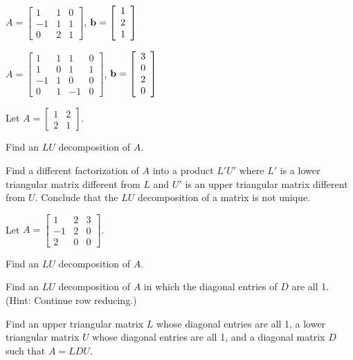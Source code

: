 	\item $A = \left[ \begin{array}{rcc} 1&1&0 \\ -1&1&1 \\ 0&2&1 \end{array} \right]$, $\mathbf{b} = \left[ \begin{array}{c} 1 \\ 2 \\ 1 \end{array} \right]$
	
	\item $A = \left[ \begin{array}{rcrc} 1&1&1&0 \\ 1&0&1&1 \\ -1&1&0&0 \\ 0&1&-1&0 \end{array} \right]$, $\mathbf{b} = \left[ \begin{array}{c} 3 \\ 0 \\ 2 \\ 0 \end{array} \right]$
	
	\ea

\item Let $A = \left[ \begin{array}{cc} 1&2\\2&1 \end{array} \right]$.
	\ba
	\item Find an $LU$ decomposition of $A$.
	\item Find a different factorization of $A$ into a product $L'U'$ where $L'$ is a lower triangular matrix different from $L$ and $U'$ is an upper triangular matrix different from $U$. Conclude that the $LU$ decomposition of a matrix is not unique. 
	\ea

\item Let $A = \left[ \begin{array}{rcc} 1&2&3\\-1&2&0 \\ 2&0&0\end{array} \right]$.
	\ba
	\item Find an $LU$ decomposition of $A$.
	\item Find an $LU$ decomposition of $A$ in which the diagonal entries of $D$ are all 1. (Hint: Continue row reducing.)
	\item Find an upper triangular matrix $L$ whose diagonal entries are all 1, a lower triangular matrix $U$ whose diagonal entries are all 1, and a diagonal matrix $D$ such that $A = LDU$.
	\ea
	
